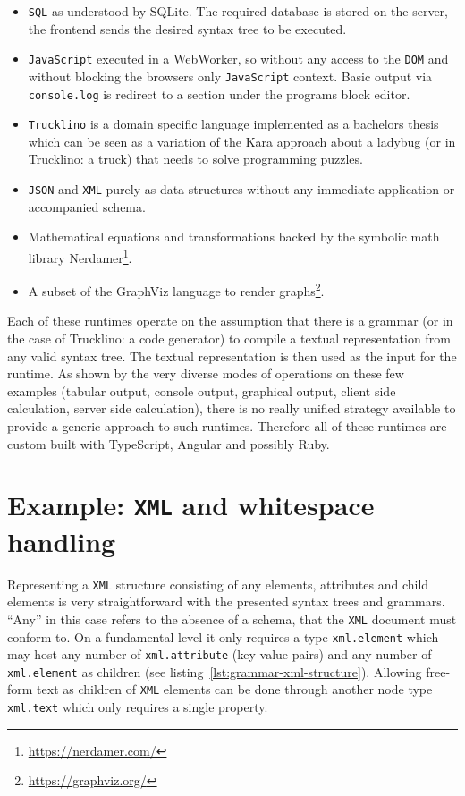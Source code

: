 \documentclass[sigconf,natbib=false,review=true]{acmart}
\begin{document}
\begin{itemize}
\item \texttt{SQL} as understood by SQLite. The required database is stored on the server, the frontend sends the desired syntax tree to be executed.

\item \texttt{JavaScript} executed in a WebWorker, so without any access to the \texttt{DOM} and without blocking the browsers only \texttt{JavaScript} context. Basic output via \texttt{console.log} is redirect to a section under the programs block editor.

\item \texttt{Trucklino} is a domain specific language implemented as a bachelors thesis \cite{popp_konzeption_2019} which can be seen as a variation of the Kara approach\cite{hartmann_kara_2001} about a ladybug (or in Trucklino: a truck) that needs to solve programming puzzles.

\item \texttt{JSON} and \texttt{XML} purely as data structures without any immediate application or accompanied schema.

\item Mathematical equations and transformations backed by the symbolic math library Nerdamer\footnote{\url{https://nerdamer.com/}}.

\item A subset of the GraphViz language to render graphs\footnote{\url{https://graphviz.org/}}.
\end{itemize}

Each of these runtimes operate on the assumption that there is a grammar (or in the case of Trucklino: a code generator) to compile a textual representation from any valid syntax tree. The textual representation is then used as the input for the runtime. As shown by the very diverse modes of operations on these few examples (tabular output, console output, graphical output, client side calculation, server side calculation), there is no really unified strategy available to provide a generic approach to such runtimes. Therefore all of these runtimes are custom built with TypeScript, Angular and possibly Ruby.

\section{Example: \texttt{XML} and whitespace handling}

Representing a \texttt{XML} structure consisting of any elements, attributes and child elements is very straightforward with the presented syntax trees and grammars. \enquote{Any} in this case refers to the absence of a schema, that the \texttt{XML} document must conform to. On a fundamental level it only requires a type \texttt{xml.element} which may host any number of \texttt{xml.attribute} (key-value pairs) and any number of \texttt{xml.element} as children (see listing~\ref{lst:grammar-xml-structure}). Allowing free-form text as children of \texttt{XML} elements can be done through another node type \texttt{xml.text} which only requires a single property.
\end{document}
